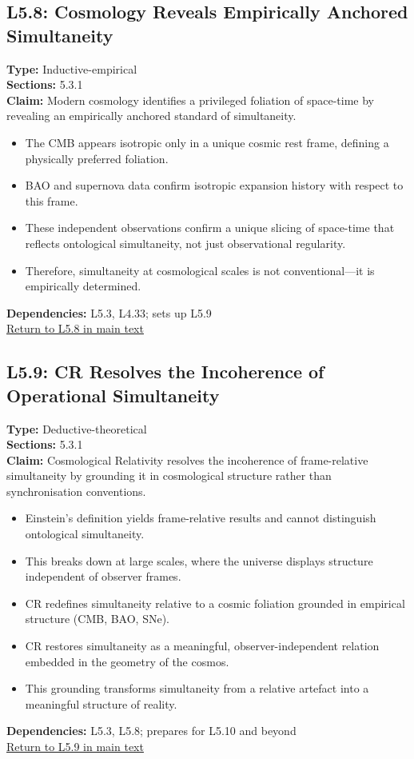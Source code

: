\documentclass[12pt]{book}
\newcommand{\returnlink}[1]{\hyperref[logic:#1]{Return to #1 in main text}\xspace}
\begin{document}
\subsection*{L5.8: Cosmology Reveals Empirically Anchored Simultaneity}
\label{appendix:L5.8}
\textbf{Type:} Inductive-empirical \\
\textbf{Sections:} 5.3.1 \\
\textbf{Claim:} Modern cosmology identifies a privileged foliation of space-time by revealing an empirically anchored standard of simultaneity.  
\begin{itemize}
  \item The CMB appears isotropic only in a unique cosmic rest frame, defining a physically preferred foliation.
  \item BAO and supernova data confirm isotropic expansion history with respect to this frame.
  \item These independent observations confirm a unique slicing of space-time that reflects ontological simultaneity, not just observational regularity.
  \item Therefore, simultaneity at cosmological scales is not conventional---it is empirically determined.
\end{itemize}
\textbf{Dependencies:} L5.3, L4.33; sets up L5.9 \\
\returnlink{L5.8}

\subsection*{L5.9: CR Resolves the Incoherence of Operational Simultaneity}
\label{appendix:L5.9}
\textbf{Type:} Deductive-theoretical \\
\textbf{Sections:} 5.3.1 \\
\textbf{Claim:} Cosmological Relativity resolves the incoherence of frame-relative simultaneity by grounding it in cosmological structure rather than synchronisation conventions.  
\begin{itemize}
  \item Einstein's definition yields frame-relative results and cannot distinguish ontological simultaneity.
  \item This breaks down at large scales, where the universe displays structure independent of observer frames.
  \item CR redefines simultaneity relative to a cosmic foliation grounded in empirical structure (CMB, BAO, SNe).
  \item CR restores simultaneity as a meaningful, observer-independent relation embedded in the geometry of the cosmos.
  \item This grounding transforms simultaneity from a relative artefact into a meaningful structure of reality.
\end{itemize}
\textbf{Dependencies:} L5.3, L5.8; prepares for L5.10 and beyond \\
\returnlink{L5.9}
\end{document}
